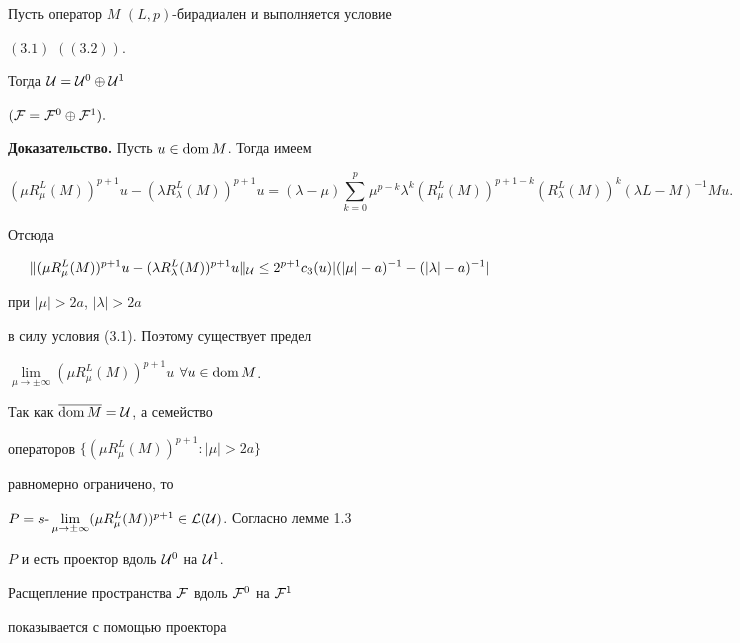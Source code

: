 \begin{thms}


Пусть оператор $M$\; $(L,p)$-бирадиален и выполняется условие


$(3.1)$ $((3.2))$.


Тогда ${\cal U}={\cal U}^0 \oplus {\cal U}^1$


$({\cal F}={\cal F}^0\oplus {\cal F}^1).$


\end{thms}





{\bf Доказательство.} Пусть $u\in \operatorname{dom} M$. Тогда имеем


$$


(\mu R_{\mu }^L(M))^{p+1}u-(\lambda R_{\lambda }^L(M))^{p+1}u=


(\lambda -\mu )\sum\limits_{k=0}^p\mu ^{p-k}\lambda ^k(R_{\mu }^L(M))^


{p+1-k}(R_{\lambda }^L(M))^k(\lambda L-M)^{-1}Mu.


$$


Отсюда


$$


\| (\mu R_{\mu }^L(M))^{p+1}u-(\lambda R_{\lambda }^L(M))^{p+1}u\| _


{{\cal U}}\le 2^{p+1}c_3 (u)|(|\mu |-a)^{-1}-(|\lambda |-a)^{-1}|


$$


при $|\mu |>2a$, $|\lambda |>2a$


в силу условия (3.1). Поэтому существует предел


$\lim\limits_{\mu\to\pm\infty }(\mu R_{\mu }^L(M))^{p+1}u$ $\forall


u\in \dom M$.


Так как $\overline {\operatorname{dom} M}={\cal U}$, а семейство


операторов $\{ (\mu


R_{\mu }^L(M))^{p+1}:|\mu |>2a\}$


равномерно ограничено, то


$P=s\text{-}\lim\limits_{\mu\to\pm\infty }(\mu R_{\mu }^L(M))^{p+1}\in


{\cal L(\cal U)}$. Согласно лемме 1.3\;


$P$ и есть проектор вдоль ${\cal U}^0$ на ${\cal U}^1$.





Расщепление пространства ${\cal F}$ вдоль ${\cal F}^0$ на ${\cal F}^1$


показывается с помощью проектора


